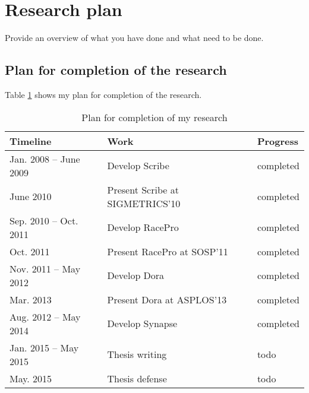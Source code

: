 \section{Research plan}
\label{ch:plan}

Provide an overview of what you have done and what need to be done.

\subsection{Plan for completion of the research}

Table \ref{tab:plan} shows my plan for completion of the research.

\begin{table}[hc]
\begin{small}
\begin{center}
\begin{tabular}{lll}
Timeline & Work & Progress\\
\hline

Jan. 2008 -- June 2009 & Develop Scribe                  & completed \\
June 2010              & Present Scribe at SIGMETRICS'10 & completed \\
Sep. 2010 -- Oct. 2011 & Develop RacePro                 & completed \\
Oct. 2011              & Present RacePro at SOSP'11      & completed \\
Nov. 2011 -- May 2012  & Develop Dora                    & completed \\
Mar. 2013              & Present Dora at ASPLOS'13       & completed \\
Aug. 2012 -- May 2014  & Develop Synapse                 & completed \\
Jan. 2015 -- May 2015  & Thesis writing                  & todo      \\
May. 2015              & Thesis defense                  & todo      \\

\end{tabular}
\end{center}
\end{small}
\caption{Plan for completion of my research}
\label{tab:plan}
\end{table}
